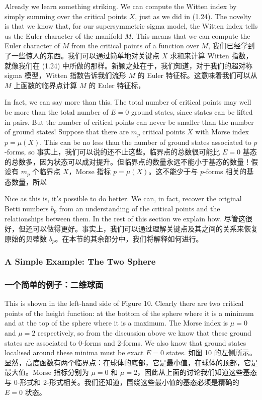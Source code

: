 \documentclass{article}
\begin{document}
\begin{paracol}{2}
Already we learn something striking. We can compute the Witten index by simply summing over the critical points $X$, just as we did in (1.24). The novelty is that we know that, for our supersymmetric sigma model, the Witten index tells us the Euler character of the manifold $M$. This means that we can compute the Euler character of $M$ from the critical points of a function over $M$,
\switchcolumn
我们已经学到了一些惊人的东西。我们可以通过简单地对关键点 $X$ 求和来计算 Witten 指数，就像我们在 (1.24) 中所做的那样。新颖之处在于，我们知道，对于我们的超对称 sigma 模型，Witten 指数告诉我们流形 $M$ 的 Euler 特征标。这意味着我们可以从 $M$ 上函数的临界点计算 $M$ 的 Euler 特征标，
\switchcolumn*

In fact, we can say more than this. The total number of critical points may well be more than the total number of $E = 0$ ground states, since states can be lifted in pairs. But the number of critical points can never be smaller than the number of ground states! Suppose that there are $m_p$ critical points $X$ with Morse index $p = \mu(X)$. This can be no less than the number of ground states associated to $p$-forms, so
\switchcolumn
事实上，我们可以说的还不止这些。临界点的总数很可能比 $E = 0$ 基态的总数多，因为状态可以成对提升。但临界点的数量永远不能小于基态的数量！假设有 $m_p$ 个临界点 $X$，Morse 指标 $p = \mu(X)$。这不能少于与 $p$-forms 相关的基态数量，所以
\switchcolumn*

Nice as this is, it’s possible to do better. We can, in fact, recover the original Betti numbers $b_p$ from an understanding of the critical points and the relationships between them. In the rest of this section we explain how.
\switchcolumn
尽管这很好，但还可以做得更好。事实上，我们可以通过理解关键点及其之间的关系来恢复原始的贝蒂数 $b_p$。在本节的其余部分中，我们将解释如何进行。
\switchcolumn*

\subsubsection*{A Simple Example: The Two Sphere}
\switchcolumn
\subsubsection*{一个简单的例子：二维球面}
\switchcolumn*

This is shown in the left-hand side of Figure 10. Clearly there are two critical points of the height function: at the bottom of the sphere where it is a minimum and at the top of the sphere where it is a maximum. The Morse index is $\mu = 0$ and $\mu = 2$ respectively, so from the discussion above we know that these ground states are associated to 0-forms and 2-forms. We also know that ground states localised around these minima must be exact $E = 0$ states.
\switchcolumn
如图 10 的左侧所示。显然，高度函数有两个临界点：在球体的底部，它是最小值，在球体的顶部，它是最大值。Morse 指标分别为 $\mu = 0$ 和 $\mu = 2$，因此从上面的讨论我们知道这些基态与 0-形式和 2-形式相关。我们还知道，围绕这些最小值的基态必须是精确的 $E = 0$ 状态。
\switchcolumn*


\end{paracol}
\end{document}
